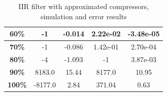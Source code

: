 \documentclass[a4paper]{article}
\begin{document}
\begin{table}[hbtp]
\begin{tabular}{|c|c|c|c|c|}
		\textbf{60\%}                                                                   & 		-1                                                                              & 		-0.014                                                                           & 2.22e-02                             &		 -3.48e-05                             \\ \hline
		\textbf{70\%}                                                                   & 		-1                                                                              & 		-0.086                                                                           & 1.42e-01                             &		 2.70e-04                              \\ \hline
		\textbf{80\%}                                                                   & 		-4                                                                              & 		-1.093                                                                           & -1                                   &		 3.87e-03                              \\ \hline
		\textbf{90\%}                                                                   & 		8183.0                                                                          & 		15.44                                                                            & 8177.0                               &		 10.95                                 \\ \hline
		\textbf{100\%}                                                                  & 		-8177.0                                                                         & 		2.84                                                                             & 371.04                               &		 0.63                                  \\ \hline
		\end{tabular}
		\caption{IIR filter with approximated compressors, simulation and error results}
		\label{tab:iir_sim}
	\end{table}
\end{document}
